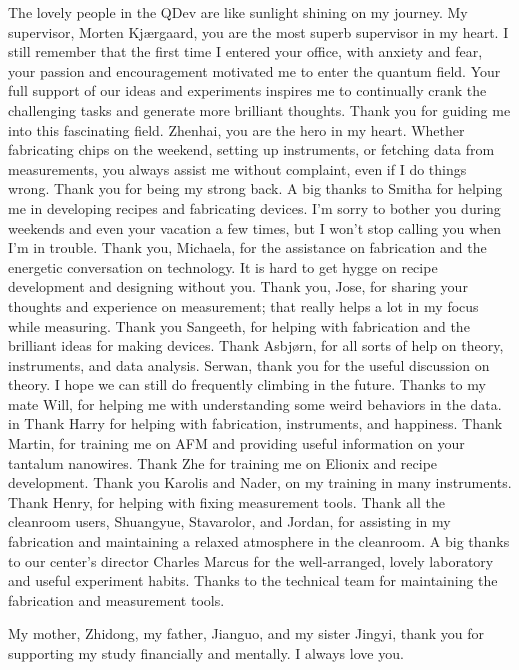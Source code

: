 The lovely people in the QDev are like sunlight shining on my journey. My supervisor, Morten Kjærgaard, you are the most superb supervisor in my heart. I still remember that the first time I entered your office, with anxiety and fear, your passion and encouragement motivated me to enter the quantum field. Your full support of our ideas and experiments inspires me to continually crank the challenging tasks and generate more brilliant thoughts. Thank you for guiding me into this fascinating field. Zhenhai, you are the hero in my heart. Whether fabricating chips on the weekend, setting up instruments, or fetching data from measurements, you always assist me without complaint, even if I do things wrong. Thank you for being my strong back. A big thanks to Smitha for helping me in developing recipes and fabricating devices. I'm sorry to bother you during weekends and even your vacation a few times, but I won't stop calling you when I'm in trouble. Thank you, Michaela, for the assistance on fabrication and the energetic conversation on technology. It is hard to get hygge on recipe development and designing without you. Thank you, Jose, for sharing your thoughts and experience on measurement; that really helps a lot in my focus while measuring. Thank you Sangeeth, for helping with fabrication and the brilliant ideas for making devices. Thank Asbjørn, for all sorts of help on theory, instruments, and data analysis. Serwan, thank you for the useful discussion on theory. I hope we can still do frequently climbing in the future. Thanks to my mate Will, for helping me with understanding some weird behaviors in the data. in Thank Harry for helping with fabrication, instruments, and happiness. Thank Martin, for training me on AFM and providing useful information on your tantalum nanowires. Thank Zhe for training me on Elionix and recipe development. Thank you Karolis and Nader, on my training in many instruments. Thank Henry, for helping with fixing measurement tools. Thank all the cleanroom users, Shuangyue, Stavarolor, and Jordan, for assisting in my fabrication and maintaining a relaxed atmosphere in the cleanroom. A big thanks to our center's director Charles Marcus for the well-arranged, lovely laboratory and useful experiment habits. Thanks to the technical team for maintaining the fabrication and measurement tools.

My mother, Zhidong, my father, Jianguo, and my sister Jingyi, thank you for supporting my study financially and mentally. I always love you.